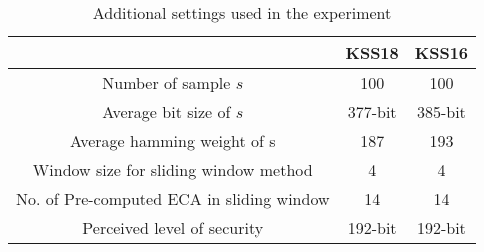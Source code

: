 \renewcommand{\baselinestretch}{1.5}
\begin{table}[htb]
	\begin{center}
		\caption{Additional  settings used in the experiment}
		\begin{tabular}{|c|c|c|}
			\hline 
			 & KSS18 & KSS16 \\ \hline
			 Number of sample $s$& 100 & 100\\ \hline
			 Average bit size  of $s$ & 377-bit & 385-bit\\ \hline
			 Average hamming weight of s & 187 & 193\\ \hline
			 Window size for sliding window method & 4 & 4\\ \hline 
			  No. of Pre-computed ECA in sliding window  & 14 & 14\\ \hline 
			  Perceived level of security & 192-bit & 192-bit\\ \hline
		\end{tabular}
		\label{additional}
	\end{center}
\end{table}
\renewcommand{\baselinestretch}{1.0} 
 
